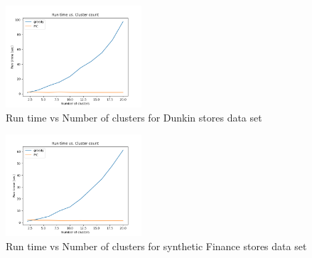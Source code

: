 \begin{figure}[H]
    \centering
    \includegraphics[width=0.45\textwidth]{assets/results/dunkin_stores/run_time_comparison.png}
    \caption{Run time vs Number of clusters for Dunkin stores data set}
    \label{fig:runtime_dunkin_stores}
\end{figure}

\begin{figure}[H]
    \centering
    \includegraphics[width=0.45\textwidth]{assets/results/syntheticFincances/run_time_comparison.png}
    \caption{Run time vs Number of clusters for synthetic Finance stores data set}
    \label{fig:runtime_syntheticFinance}
\end{figure}

\clearpage

